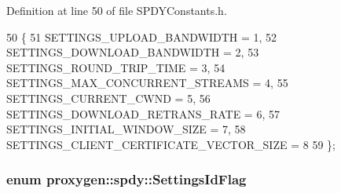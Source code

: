 Definition at line 50 of file S\+P\+D\+Y\+Constants.\+h.


\begin{DoxyCode}
50                 \{
51   SETTINGS_UPLOAD_BANDWIDTH = 1,
52   SETTINGS_DOWNLOAD_BANDWIDTH = 2,
53   SETTINGS_ROUND_TRIP_TIME = 3,
54   SETTINGS_MAX_CONCURRENT_STREAMS = 4,
55   SETTINGS_CURRENT_CWND = 5,
56   SETTINGS_DOWNLOAD_RETRANS_RATE = 6,
57   SETTINGS_INITIAL_WINDOW_SIZE = 7,
58   SETTINGS_CLIENT_CERTIFICATE_VECTOR_SIZE = 8
59 \};
\end{DoxyCode}
\subsubsection[{Settings\+Id\+Flag}]{\setlength{\rightskip}{0pt plus 5cm}enum {\bf proxygen\+::spdy\+::\+Settings\+Id\+Flag}}\label{namespaceproxygen_1_1spdy_a1bb79c8a84c10e589aba333e07fb68b6}
